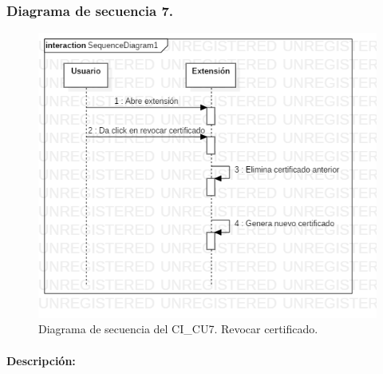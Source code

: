 \documentclass[12pt, a4paper, titlepage]{report}
\begin{document}
    			\subsubsection{Diagrama de secuencia 7.}
        			\begin{figure}[H]
        				\begin{center}    		    	\includegraphics[width=15cm]{./imagenes/Disenio/Componente_1/CI_SD_UC7.png}
        				\caption[Diagrama de secuencia 7 del Componente I]{Diagrama de secuencia del CI\_CU7. Revocar certificado.}
        				\end{center}
        			\end{figure}
        			
        			\paragraph{Descripción:}
        		
    			
    			
    		
    		
    		
\end{document}
